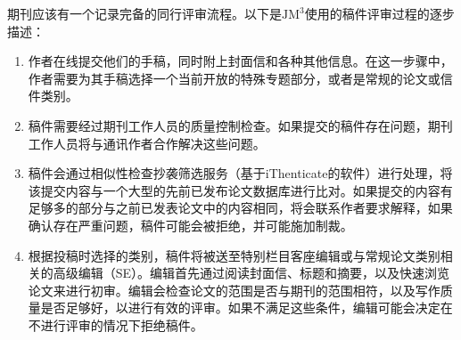 期刊应该有一个记录完备的同行评审流程。以下是$\mathrm{JM}^{3}$使用的稿件评审过程的逐步描述：

\begin{enumerate}
\item 作者在线提交他们的手稿，同时附上封面信和各种其他信息。在这一步骤中，作者需要为其手稿选择一个当前开放的特殊专题部分，或者是常规的论文或信件类别。

\item 稿件需要经过期刊工作人员的质量控制检查。如果提交的稿件存在问题，期刊工作人员将与通讯作者合作解决这些问题。

\item 稿件会通过相似性检查抄袭筛选服务（基于iThenticate的软件）进行处理，将该提交内容与一个大型的先前已发布论文数据库进行比对。如果提交的内容有足够多的部分与之前已发表论文中的内容相同，将会联系作者要求解释，如果确认存在严重问题，稿件可能会被拒绝，并可能施加制裁。

\item 根据投稿时选择的类别，稿件将被送至特别栏目客座编辑或与常规论文类别相关的高级编辑（SE）。编辑首先通过阅读封面信、标题和摘要，以及快速浏览论文来进行初审。编辑会检查论文的范围是否与期刊的范围相符，以及写作质量是否足够好，以进行有效的评审。如果不满足这些条件，编辑可能会决定在不进行评审的情况下拒绝稿件。


\end{enumerate}
